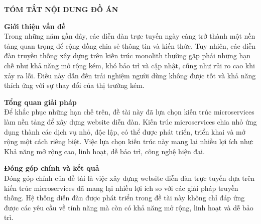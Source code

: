 \documentclass[../index.tex]{subfiles}
\begin{document}
    \newpage
    \begin{center}
        \Large{\textbf{TÓM TẮT NỘI DUNG ĐỒ ÁN}}\\
    \end{center}
    \vspace{1cm}

    \textbf{Giới thiệu vấn đề}\\
    \indent
    Trong những năm gần đây, các diễn đàn trực tuyến ngày càng trở thành một nền
    tảng quan trọng để cộng đồng chia sẻ thông tin và kiến thức. Tuy nhiên, các diễn
    đàn truyền thống xây dựng trên kiến trúc monolith thường gặp phải những hạn chế
    như khả năng mở rộng kém, khó bảo trì và cập nhật, cũng như rủi ro cao khi xảy
    ra lỗi. Điều này dẫn đến trải nghiệm người dùng không được tốt và khả năng
    thích ứng với sự thay đổi của thị trường kém.

    \textbf{Tổng quan giải pháp}\\
    \indent
    Để khắc phục những hạn chế trên, đề tài này đã lựa chọn kiến trúc microservices
    làm nền tảng để xây dựng website diễn đàn. Kiến trúc microservices chia nhỏ
    ứng dụng thành các dịch vụ nhỏ, độc lập, có thể được phát triển, triển khai và
    mở rộng một cách riêng biệt. Việc lựa chọn kiến trúc này mang lại nhiều lợi
    ích như: Khả năng mở rộng cao, linh hoạt, dễ bảo trì, công nghệ hiện đại.

    \textbf{Đóng góp chính và kết quả}\\
    \indent
    Đóng góp chính của đề tài là việc xây dựng website diễn đàn trực tuyến dựa trên
    kiến trúc microservices đã mang lại nhiều lợi ích so với các giải pháp truyền
    thống. Hệ thống diễn đàn được phát triển trong đề tài này không chỉ đáp ứng
    được các yêu cầu về tính năng mà còn có khả năng mở rộng, linh hoạt và dễ bảo
    trì.
\end{document}
